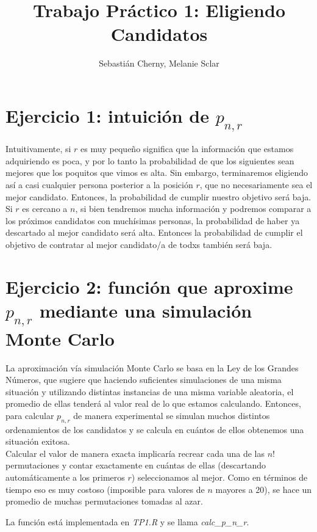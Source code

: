 \documentclass[a4paper]{article}
\title{Trabajo Práctico 1: Eligiendo Candidatos}
\author{Sebastián Cherny, Melanie Sclar}
\begin{document}
\maketitle
\section*{Ejercicio 1: intuición de $p_{n,r}$}
Intuitivamente, si $r$ es muy pequeño significa que la información que estamos adquiriendo es poca, y por lo tanto la probabilidad de que los siguientes sean mejores que los poquitos que vimos es alta. Sin embargo, terminaremos eligiendo así a casi cualquier persona posterior a la posición $r$, que no necesariamente sea el mejor candidato. Entonces, la probabilidad de cumplir nuestro objetivo será baja. \\

Si $r$ es cercano a $n$, si bien tendremos mucha información y podremos comparar a los próximos candidatos con muchísimas personas, la probabilidad de haber ya descartado al mejor candidato será alta. Entonces la probabilidad de cumplir el objetivo de contratar al mejor candidato/a de todxs también será baja.

\section*{Ejercicio 2: función que aproxime $p_{n,r}$ mediante una simulación Monte Carlo}
La aproximación vía simulación Monte Carlo se basa en la Ley de los Grandes Números, que sugiere que haciendo suficientes simulaciones de una misma situación y utilizando distintas instancias de una misma variable aleatoria, el promedio de ellas tenderá al valor real de lo que estamos calculando. Entonces, para calcular $p_{n,r}$ de manera experimental se simulan muchos distintos ordenamientos de los candidatos y se calcula en cuántos de ellos obtenemos una situación exitosa.\\

Calcular el valor de manera exacta implicaría recrear cada una de las $n!$ permutaciones y contar exactamente en cuántas de ellas (descartando automáticamente a los primeros $r$) seleccionamos al mejor. Como en términos de tiempo eso es muy costoso (imposible para valores de $n$ mayores a 20), se hace un promedio de muchas permutaciones tomadas al azar.

La función está implementada en \textit{TP1.R} y se llama \textit{calc\_p\_n\_r}.
\end{document}
